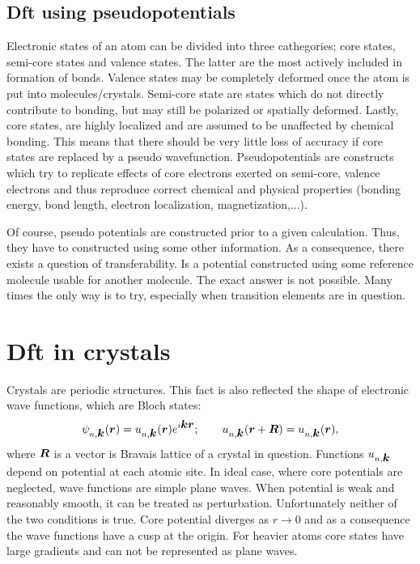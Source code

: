 \documentclass[openany, longbibliography,slovene,a4paper,12pt]{article}
\def\vec#1{\mbox{\boldmath$#1$}}
\begin{document}
\subsection{Dft using pseudopotentials}
Electronic states of an atom can be divided into three cathegories; core states,
semi-core states and valence states. The latter are the most actively included
in formation of bonds. Valence states may be completely deformed once the atom
is put into molecules/crystals. Semi-core state are states which do not
directly contribute to bonding, but may still be polarized or spatially
deformed. Lastly, core states, are highly localized and are assumed to be
unaffected by chemical bonding. This means that there should be very little loss
of accuracy if core states are replaced by a pseudo wavefunction.
Pseudopotentials are constructs which try to
replicate effects of core electrons exerted on semi-core, valence electrons and
thus reproduce correct chemical and physical properties (bonding energy, bond
length, electron localization, magnetization,...).

Of course, pseudo potentials are constructed prior to a given calculation. Thus,
they have to constructed using some other information. As a consequence, there
exists a question of transferability. Is a potential constructed using some
reference molecule usable for another molecule. The exact answer is
not possible. Many times the only way is to try, especially when transition
elements are in question.


\section{Dft in crystals}
Crystals are periodic structures. This fact is also reflected the shape of
electronic  wave functions, which are Bloch states:
\begin{equation}
  \psi_{n, \vec k}(\vec r) = u_{n, \vec k}(\vec r)e^{i\vec k \vec r};\quad \textrm\quad u_{n,\vec k}(\vec r + \vec R) =  u_{n,\vec k}(\vec r),
\end{equation}
where $\vec R$ is a vector is Bravais lattice of a crystal in question.
Functions $u_{n,\vec k}$ depend on potential at each atomic site.
In ideal case, where core potentials are neglected,
wave functions are simple plane waves. When potential is weak and
reasonably smooth, it can be treated as perturbation. Unfortunately neither of
the two conditions is true. Core potential diverges as $r \rightarrow 0$
and as a consequence the wave functions have a cusp at the origin. For heavier
atoms core states have large gradients and can not be represented as plane waves.
\end{document}
